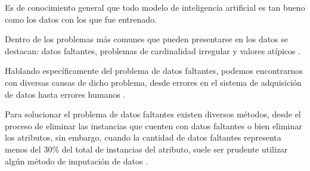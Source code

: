 Es de conocimiento general que todo modelo de inteligencia artificial es tan bueno como los datos con los que fue entrenado.

Dentro de los problemas más comunes que pueden presentarse en los datos se destacan: datos faltantes, problemas de cardinalidad irregular y valores atípicos \cite{Aceves2021}.

Hablando específicamente del problema de datos faltantes, podemos encontrarnos con diversas causas de dicho problema, desde errores en el sistema de adquisición de datos hasta errores humanos \cite{Aceves2021}.

Para solucionar el problema de datos faltantes existen diversos métodos, desde el proceso de eliminar las instancias que cuenten con datos faltantes o bien eliminar los atributos, sin embargo, cuando la cantidad de datos faltantes representa menos del 30\% del total de instancias del atributo, suele ser prudente utilizar algún método de imputación de datos \cite{Aceves2021}.
